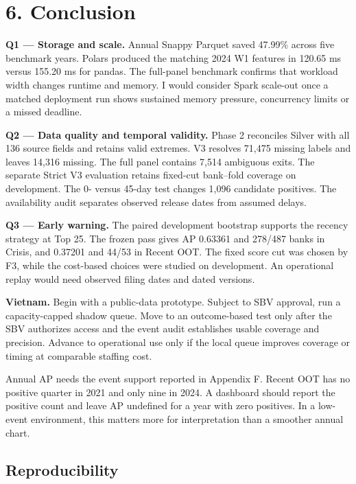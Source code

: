 \documentclass[
  12pt,
  a4paper,
]{article}
\renewcommand{\arraystretch}{1.16}
\begin{document}
\fontsize{10pt}{12.77pt}\selectfont
\setlength{\parskip}{2.9pt plus .55pt minus .3pt}
\renewcommand{\arraystretch}{1.10}

\section{6. Conclusion}\label{conclusion}

\textbf{Q1 --- Storage and scale.} Annual Snappy Parquet saved 47.99\%
across five benchmark years. Polars produced the matching 2024 W1
features in 120.65 ms versus 155.20 ms for pandas. The full-panel
benchmark confirms that workload width changes runtime and memory. I
would consider Spark scale-out once a matched deployment run shows
sustained memory pressure, concurrency limits or a missed deadline.

\textbf{Q2 --- Data quality and temporal validity.} Phase 2 reconciles
Silver with all 136 source fields and retains valid extremes. V3
resolves 71,475 missing labels and leaves 14,316 missing. The full panel
contains 7,514 ambiguous exits. The separate Strict V3 evaluation
retains fixed-cut bank--fold coverage on development. The 0- versus
45-day test changes 1,096 candidate positives. The availability audit
separates observed release dates from assumed delays.

\textbf{Q3 --- Early warning.} The paired development bootstrap supports
the recency strategy at Top 25. The frozen pass gives AP 0.63361 and
278/487 banks in Crisis, and 0.37201 and 44/53 in Recent OOT. The fixed
score cut was chosen by F3, while the cost-based choices were studied on
development. An operational replay would need observed filing dates and
dated versions.

\textbf{Vietnam.} Begin with a public-data prototype. Subject to SBV
approval, run a capacity-capped shadow queue. Move to an outcome-based
test only after the SBV authorizes access and the event audit
establishes usable coverage and precision. Advance to operational use
only if the local queue improves coverage or timing at comparable
staffing cost.

Annual AP needs the event support reported in Appendix F. Recent OOT has
no positive quarter in 2021 and only nine in 2024. A dashboard should
report the positive count and leave AP undefined for a year with zero
positives. In a low-event environment, this matters more for
interpretation than a smoother annual chart.

\subsection{Reproducibility}\label{reproducibility}
\end{document}
